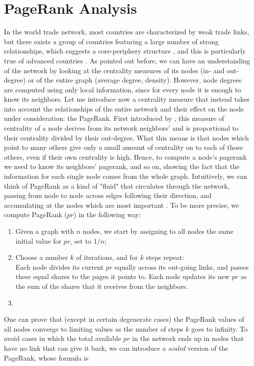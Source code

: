 \pagebreak
\section{PageRank Analysis}
In the world trade network, most countries are characterized by weak trade links, but there exists a group of countries featuring a large number of strong relationships, which suggests a core-periphery structure \cite{fagiolo}, and this is particularly true of advanced countries \cite{deguchi}. As pointed out before, we can have an understanding of the network by looking at the centrality measures of its nodes (in- and out-degree) or of the entire graph (average degree, density). However, node degrees are computed using only local information, since for every node it is enough to know its neighbors. Let me introduce now a centrality measure that instead takes into account the relationships of the entire network and their effect on the node under consideration: the PageRank. 
First introduced by \textcite{page1999pagerank}, this measure of centrality of a node derives from its network neighbors' and is proportional to their centrality divided by their out-degree. What this means is that nodes which point to many others give only a small amount of centrality on to each of those others, even if their own centrality is high. Hence, to compute a node's pagerank we need to know its neighbors' pagerank, and so on, showing the fact that the information for each single node comes from the whole graph. Intuitively, we can think of PageRank as a kind of "fluid" that circulates through the network, passing from node to node across edges following their direction, and accumulating at the nodes which are most important \cite{easley2012networks}. To be more precise, we compute PageRank ($pr$) in the following way:
\begin{enumerate}
    \item Given a graph with $n$ nodes, we start by assigning to all nodes the same initial value for $pr$, set to $1/n$;
    \item Choose a number $k$ of iterations, and for $k$ steps repeat:\\
            Each node divides its current $pr$ equally across its out-going links, and passes these equal shares to the pages it points to. Each node updates its new $pr$ as the sum of the shares that it receives from the neighbors.
    \item 
\end{enumerate}
One can prove that (except in certain degenerate cases) the PageRank values of all nodes converge to limiting values as the number of steps $k$ goes to infinity. To avoid cases in which the total available $pr$ in the network ends up in nodes that have no link that can give it back, we can introduce a \textit{scaled} version of the PageRank, whose formula is
